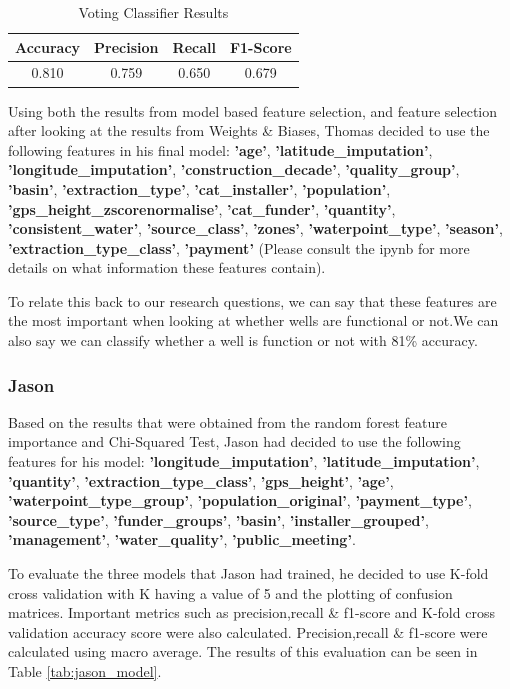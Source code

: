 \documentclass[conference]{IEEEtran}
\begin{document}
\begin{table}[H]
  \centering
  \caption{Voting Classifier Results}
  \label{tab:voting_classification_results}
  \begin{tabular}{|c|c|c|c|}
    \hline
    Accuracy & Precision & Recall & F1-Score \\
    \hline
    0.810 & 0.759 & 0.650 & 0.679 \\
    \hline
  \end{tabular}
\end{table}

Using both the results from model based feature selection, and feature selection after looking at the results from Weights \& Biases, Thomas decided to use the following features in his final model: \textbf{'age'}, \textbf{'latitude\_imputation'}, \textbf{'longitude\_imputation'}, \textbf{'construction\_decade'}, \textbf{'quality\_group'}, \textbf{'basin'}, \textbf{'extraction\_type'}, \textbf{'cat\_installer'}, \textbf{'population'}, \textbf{'gps\_height\_zscorenormalise'}, \textbf{'cat\_funder'}, \textbf{'quantity'}, \textbf{'consistent\_water'}, \textbf{'source\_class'}, \textbf{'zones'}, \textbf{'waterpoint\_type'}, \textbf{'season'}, \textbf{'extraction\_type\_class'}, \textbf{'payment'} (Please consult the ipynb for more details on what information these features contain).

To relate this back to our research questions, we can say that these features are the most important when looking at whether wells are functional or not.We can also say we can classify whether a well is function or not with 81\% accuracy.

\subsubsection{Jason}

Based on the results that were obtained from the random forest feature importance and Chi-Squared Test, Jason had decided to use the following features for his model: \textbf{'longitude\_imputation'}, \textbf{'latitude\_imputation'}, \textbf{'quantity'}, \textbf{'extraction\_type\_class'}, \textbf{'gps\_height'}, \textbf{'age'}, \textbf{'waterpoint\_type\_group'}, \textbf{'population\_original'}, \textbf{'payment\_type'}, \textbf{'source\_type'}, \textbf{'funder\_groups'}, \textbf{'basin'}, \textbf{'installer\_grouped'}, \textbf{'management'}, \textbf{'water\_quality'}, \textbf{'public\_meeting'}.

To evaluate the three models that Jason had trained, he decided to use K-fold cross validation with K having a value of 5 and the plotting of confusion matrices. Important metrics such as precision,recall \& f1-score and K-fold cross validation accuracy score were also calculated. Precision,recall \& f1-score were calculated using macro average. The results of this evaluation can be seen in Table \ref{tab:jason_model}.
\end{document}
